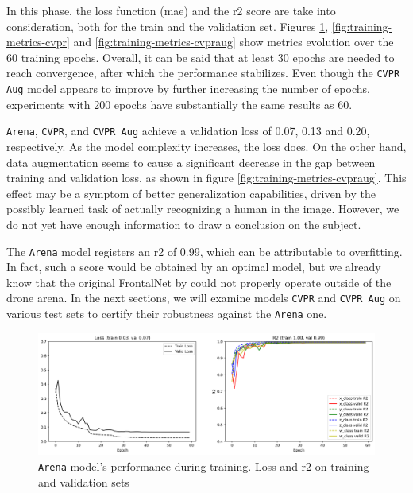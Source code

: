 In this phase, the loss function (\gls{mae}) and the \gls{r2} score are take into consideration, both for the train and the validation set. Figures \ref{fig:training-metrics-arena}, \ref{fig:training-metrics-cvpr} and \ref{fig:training-metrics-cvpraug} show metrics evolution over the 60 training epochs. Overall, it can be said that at least 30 epochs are needed to reach convergence, after which the performance stabilizes. Even though the \texttt{CVPR Aug} model appears to improve by further increasing the number of epochs, experiments with 200 epochs have substantially the same results as 60.

\texttt{Arena}, \texttt{CVPR}, and \texttt{CVPR Aug} achieve a validation loss of 0.07, 0.13 and 0.20, respectively. As the model complexity increases, the loss does. On the other hand, data augmentation seems to cause a significant decrease in the gap between training and validation loss, as shown in figure \ref{fig:training-metrics-cvpraug}. This effect may be a symptom of better generalization capabilities, driven by the possibly learned task of actually recognizing a human in the image. However, we do not yet have enough information to draw a conclusion on the subject. 

The \texttt{Arena} model registers an \gls{r2} of 0.99, which can be attributable to overfitting. In fact, such a score would be obtained by an optimal model, but we already know that the original FrontalNet by \cite{mantegazza2019visionbased} could not properly operate outside of the drone arena. In the next sections, we will examine models \texttt{CVPR} and \texttt{CVPR Aug} on various test sets to certify their robustness against the \texttt{Arena} one.

\begin{figure}[H]
	\centering
	\includegraphics[width=1 \textwidth]{"contents/images/06-training-arena"}
	\caption[\texttt{Arena} model's performance during training. Loss and \gls{r2} on training and validation sets]{\texttt{Arena} model's performance during training. Loss and \gls{r2} on training and validation sets}
	\label{fig:training-metrics-arena}
\end{figure}

